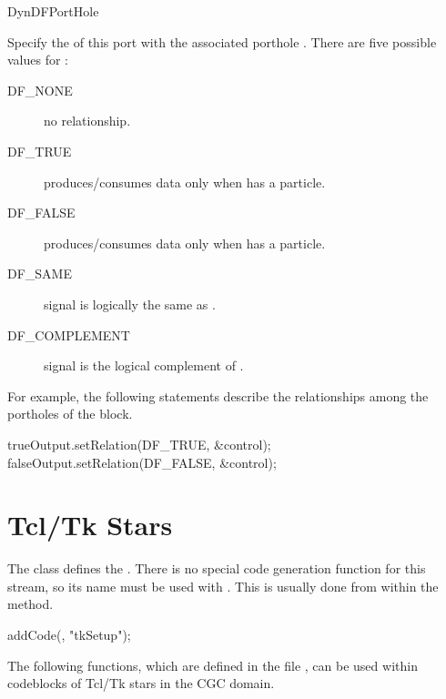 \begin{indexlist}{DynDFPortHole}

Specify the  of this port with the associated porthole
.  There are five possible values for :
\begin{description}
\item[DF\_NONE] no relationship.
\item[DF\_TRUE] produces/consumes data only when 
has a  particle.
\item[DF\_FALSE] produces/consumes data only when 
has a  particle.
\item[DF\_SAME] signal is logically the same as .
\item[DF\_COMPLEMENT] signal is the logical complement of .
\end{description}

\end{indexlist}

For example, the following statements describe the relationships among
the portholes of the  block.

\begin{example}
trueOutput.setRelation(DF\_TRUE, \&control);
falseOutput.setRelation(DF\_FALSE, \&control);
\end{example}

\section{Tcl/Tk Stars}
\label{CGC Tcl/Tk Stars}

The  class defines the
.  There is no special code generation function for this stream,
so its name must be used with .  This is usually done from within the
 method.

\begin{example}
addCode(, "tkSetup");
\end{example}

The following functions, which are defined in the file
, can be used within codeblocks of
Tcl/Tk stars in the CGC domain.

